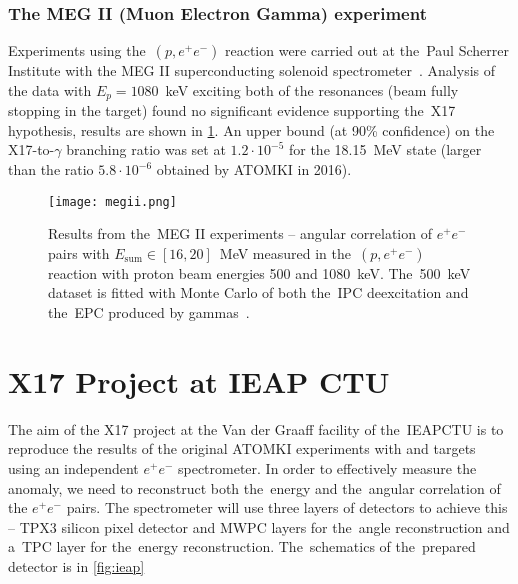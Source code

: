 			\subsubsection{The MEG II (Muon Electron Gamma) experiment}
				Experiments using the~$(p,e^+e^-)$ reaction were carried out at the~Paul Scherrer Institute with the MEG II superconducting solenoid spectrometer~\cite{megii}. Analysis of the data with $E_p = 1080$~keV exciting both of the resonances (beam fully stopping in the target) found no significant evidence supporting the~X17 hypothesis, results are shown in \cref{fig:megii}. An upper bound (at 90\% confidence) on the X17\nobreakdash-to\nobreakdash-$\gamma$ branching ratio was set at $1.2\cdot10^{-5}$ for the 18.15~MeV state (larger than the ratio $5.8\cdot10^{-6}$ obtained by ATOMKI in 2016).
				
				\begin{figure}
					\centering
					\texttt{[image: megii.png]}
					\caption{Results from the~MEG II experiments -- angular correlation of $e^+e^-$ pairs with $E_\text{sum} \in [16,20]$~MeV measured in the~$(p,e^+e^-)$ reaction with proton beam energies 500 and 1080~keV. The~500~keV dataset is fitted with Monte Carlo of both the~\ac{IPC} deexcitation and the~\ac{EPC} produced by gammas~\cite{megii}.}
					\label{fig:megii}
				\end{figure}
			
	
	\section{X17 Project at IEAP CTU}
	\label{sec:IEAP}
		The aim of the X17 project at the Van der Graaff facility of the~\acl{IEAPCTU} is to reproduce the results of the original ATOMKI experiments with  and  targets using an independent $e^+e^-$ spectrometer. In order to effectively measure the anomaly, we need to reconstruct both the~energy and the~angular correlation of the $e^+e^-$ pairs. The spectrometer will use three layers of detectors to achieve this -- \acf{TPX3} silicon pixel detector and \acf{MWPC} layers for the~angle reconstruction and a~\acf{TPC} layer for the~energy reconstruction. The~schematics of the~prepared detector is in \cref{fig:ieap}
			
